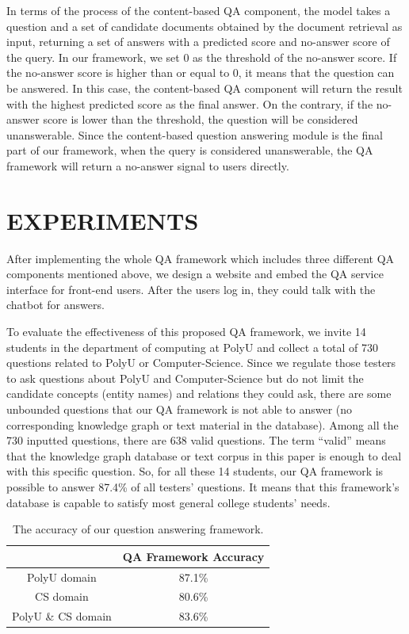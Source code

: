 \documentclass[11pt]{article}
\begin{document}
In terms of the process of the content-based QA component, the model takes a question and a set of candidate documents obtained by the document retrieval as input, returning a set of answers with a predicted score and no-answer score of the query. In our framework, we set 0 as the threshold of the no-answer score. If the no-answer score is higher than or equal to 0, it means that the question can be answered. In this case, the content-based QA component will return the result with the highest predicted score as the final answer. On the contrary, if the no-answer score is lower than the threshold, the question will be considered unanswerable. Since the content-based question answering module is the final part of our framework, when the query is considered unanswerable, the QA framework will return a no-answer signal to users directly.




\section{EXPERIMENTS}

After implementing the whole QA framework which includes three different QA components mentioned above, we design a website and embed the QA service interface for front-end users. After the users log in, they could talk with the chatbot for answers.

To evaluate the effectiveness of this proposed QA framework, we invite 14 students in the department of computing at PolyU and collect a total of 730 questions related to PolyU or Computer-Science. Since we regulate those testers to ask questions about PolyU and Computer-Science but do not limit the candidate concepts (entity names) and relations they could ask, there are some unbounded questions that our QA framework is not able to answer (no corresponding knowledge graph or text material in the database). Among all the 730 inputted questions, there are 638 valid questions. The term ``valid'' means that the knowledge graph database or text corpus in this paper is enough to deal with this specific question. So, for all these 14 students, our QA framework is possible to answer 87.4\% of all testers' questions. It means that this framework's database is capable to satisfy most general college students' needs.


\begin{table}[h!]
\caption{The accuracy of our question answering framework.}
\begin{center}
\begin{tabular}{ |c|c| }
  \hline
   & QA Framework Accuracy \\
  \hline
  PolyU domain & 87.1\% \\
  \hline
  CS domain & 80.6\% \\
  \hline
  PolyU \& CS domain & 83.6\% \\
  \hline
\end{tabular}
\end{center}
\end{table}
\end{document}
